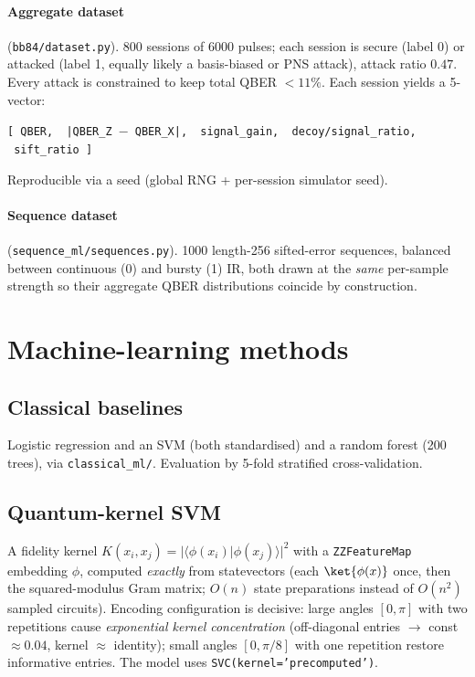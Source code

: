 \documentclass[11pt]{article}
\begin{document}
\paragraph{Aggregate dataset} (\texttt{bb84/dataset.py}). 800 sessions of 6000
pulses; each session is secure (label 0) or attacked (label 1, equally likely a
basis-biased or PNS attack), attack ratio $0.47$. Every attack is constrained to
keep total QBER $<11\%$. Each session yields a 5-vector:
\begin{center}
\texttt{[ QBER, \ |QBER\_Z $-$ QBER\_X|, \ signal\_gain, \ decoy/signal\_ratio, \ sift\_ratio ]}
\end{center}
Reproducible via a seed (global RNG + per-session simulator seed).

\paragraph{Sequence dataset} (\texttt{sequence\_ml/sequences.py}). 1000 length-256
sifted-error sequences, balanced between continuous (0) and bursty (1) IR, both
drawn at the \emph{same} per-sample strength so their aggregate QBER distributions
coincide by construction.

\section{Machine-learning methods}
\subsection{Classical baselines}
Logistic regression and an SVM (both standardised) and a random forest
(200 trees), via \texttt{classical\_ml/}. Evaluation by 5-fold stratified
cross-validation.

\subsection{Quantum-kernel SVM}
A fidelity kernel $K(x_i,x_j)=|\langle\phi(x_i)|\phi(x_j)\rangle|^2$ with a
\texttt{ZZFeatureMap} embedding $\phi$, computed \emph{exactly} from statevectors
(each $\ket{\phi(x)}$ once, then the squared-modulus Gram matrix; $O(n)$ state
preparations instead of $O(n^2)$ sampled circuits). Encoding configuration is
decisive: large angles $[0,\pi]$ with two repetitions cause \emph{exponential
kernel concentration} (off-diagonal entries $\to$ const $\approx0.04$, kernel
$\approx$ identity); small angles $[0,\pi/8]$ with one repetition restore
informative entries. The model uses \texttt{SVC(kernel='precomputed')}.
\end{document}
